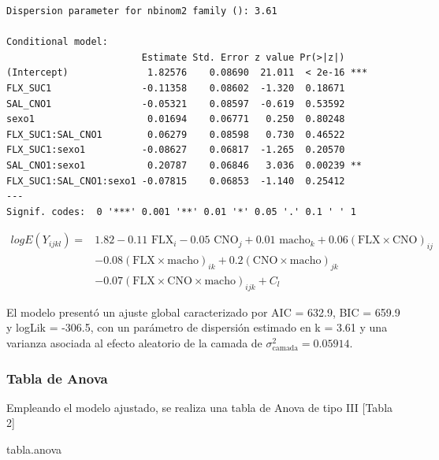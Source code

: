 \documentclass[
  letterpaper,
  DIV=11,
  numbers=noendperiod]{scrartcl}
\newenvironment{Shaded}{\begin{snugshade}}{\end{snugshade}}
\newcommand{\NormalTok}[1]{\textcolor[rgb]{0.00,0.23,0.31}{#1}}
\begin{document}
\begin{tcolorbox}[enhanced jigsaw, arc=.35mm, bottomrule=.15mm, breakable, colback=white, colframe=quarto-callout-note-color-frame, left=2mm, leftrule=.75mm, opacityback=0, rightrule=.15mm, toprule=.15mm]
\begin{minipage}[t]{\textwidth - 5.5mm}
\begin{verbatim}
Dispersion parameter for nbinom2 family (): 3.61 

Conditional model:
                        Estimate Std. Error z value Pr(>|z|)    
(Intercept)              1.82576    0.08690  21.011  < 2e-16 ***
FLX_SUC1                -0.11358    0.08602  -1.320  0.18671    
SAL_CNO1                -0.05321    0.08597  -0.619  0.53592    
sexo1                    0.01694    0.06771   0.250  0.80248    
FLX_SUC1:SAL_CNO1        0.06279    0.08598   0.730  0.46522    
FLX_SUC1:sexo1          -0.08627    0.06817  -1.265  0.20570    
SAL_CNO1:sexo1           0.20787    0.06846   3.036  0.00239 ** 
FLX_SUC1:SAL_CNO1:sexo1 -0.07815    0.06853  -1.140  0.25412    
---
Signif. codes:  0 '***' 0.001 '**' 0.01 '*' 0.05 '.' 0.1 ' ' 1
\end{verbatim}

\end{minipage}%
\end{tcolorbox}

\[\begin{aligned}
logE(Y_{ijkl}) = {} & 1.82 -0.11 \text{ FLX}_i -0.05 \text{ CNO}_j + 0.01\text{ macho}_k + 0.06 (\text{FLX} \times \text{CNO})_{ij} \\
& -0.08 (\text{FLX} \times \text{macho})_{ik} + 0.2 (\text{CNO} \times \text{macho})_{jk} \\
& -0.07 (\text{FLX} \times \text{CNO} \times \text{macho})_{ijk} + C_l
\end{aligned}\]

El modelo presentó un ajuste global caracterizado por AIC = 632.9, BIC =
659.9 y logLik = -306.5, con un parámetro de dispersión estimado en k =
3.61 y una varianza asociada al efecto aleatorio de la camada de
\(\sigma^2_{\text{camada}} = 0.05914\).

\subsubsection{Tabla de Anova}\label{tabla-de-anova}

Empleando el modelo ajustado, se realiza una tabla de Anova de tipo III
{[}Tabla 2{]}

\begin{Shaded}
\begin{Highlighting}[]
\NormalTok{tabla.anova}
\end{Highlighting}
\end{Shaded}
\end{document}
